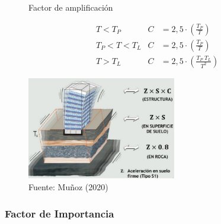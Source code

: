 \documentclass{article}%
\begin{document}
\begin{figure}[h!]%
\caption{Factor de amplificación}%
\begin{minipage}{0.5\textwidth}%

    \begin{align*}
        &T< T_{P}         &   C&=2,5\cdot\left ( \frac{T_{P}}{T} \right )\\
        &T_{P}< T< T_{L}  &   C&=2,5\cdot\left ( \frac{T_{P}}{T} \right )\\
        &T> T_{L}         &   C&=2,5\cdot\left ( \frac{T_{P}\;T_{L}}{T^{2}} \right )
    \end{align*}%
\end{minipage}%
\begin{minipage}{0.4\textwidth}%
\centering%
\includegraphics[width=6.5cm]{Amplificacion}%
\end{minipage}%
\caption*{Fuente: Muñoz (2020)}%
\end{figure}

%
\subsubsection{Factor de Importancia}%
\label{ssubsec:FactordeImportancia}%
%
\end{document}
